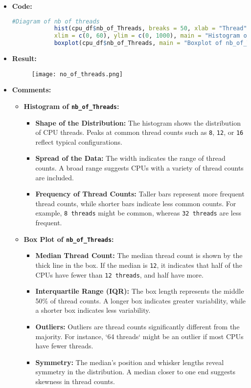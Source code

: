 \documentclass{article}
\begin{document}
	\begin{itemize}
		\item \textbf{Code:}
		\begin{lstlisting}[basicstyle=\ttfamily, frame=single,language=R]
			#Diagram of nb of threads
			hist(cpu_df$nb_of_Threads, breaks = 50, xlab = "Thread", ylab = "Frequency",
			xlim = c(0, 60), ylim = c(0, 1000), main = "Histogram of nb_of_Threads")
			boxplot(cpu_df$nb_of_Threads, main = "Boxplot of nb_of_Threads")
		\end{lstlisting}
		\item \textbf{Result:}
		\begin{figure}[h]
			\centering
			\texttt{[image: no\_of\_threads.png]}  %
			\label{fig:enter-label}
		\end{figure}
		\item \textbf{Comments:}
		\begin{itemize}
			\item \textbf{Histogram of \texttt{nb\_of\_Threads}:}
			\begin{itemize}
				\item \textbf{Shape of the Distribution:} The histogram shows the distribution of CPU threads. Peaks at common thread counts such as \texttt{8}, \texttt{12}, or \texttt{16} reflect typical configurations.
				\item \textbf{Spread of the Data:} The width indicates the range of thread counts. A broad range suggests CPUs with a variety of thread counts are included.
				\item \textbf{Frequency of Thread Counts:} Taller bars represent more frequent thread counts, while shorter bars indicate less common counts. For example, \texttt{8 threads} might be common, whereas \texttt{32 threads} are less frequent.
			\end{itemize}
			\item \textbf{Box Plot of \texttt{nb\_of\_Threads}:}
			\begin{itemize}
				\item \textbf{Median Thread Count:} The median thread count is shown by the thick line in the box. If the median is \texttt{12}, it indicates that half of the CPUs have fewer than \texttt{12 threads}, and half have more.
				\item \textbf{Interquartile Range (IQR):} The box length represents the middle 50\% of thread counts. A longer box indicates greater variability, while a shorter box indicates less variability.
				\item \textbf{Outliers:} Outliers are thread counts significantly different from the majority. For instance, `64 threads` might be an outlier if most CPUs have fewer threads.
				\item \textbf{Symmetry:} The median’s position and whisker lengths reveal symmetry in the distribution. A median closer to one end suggests skewness in thread counts.
			\end{itemize}
		\end{itemize}
	\end{itemize}
\end{document}
